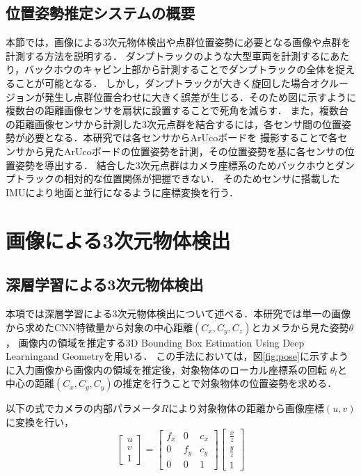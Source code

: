\subsection{位置姿勢推定システムの概要}
本節では，画像による3次元物体検出や点群位置姿勢に必要となる画像や点群を計測する方法を説明する．
ダンプトラックのような大型車両を計測するにあたり，バックホウのキャビン上部から計測することでダンプトラックの全体を捉えることが可能となる．
しかし，ダンプトラックが大きく旋回した場合オクルージョンが発生し点群位置合わせに大きく誤差が生じる．そのため図に示すように複数台の距離画像センサを扇状に設置することで死角を減らす．
また，複数台の距離画像センサから計測した3次元点群を結合するには，各センサ間の位置姿勢が必要となる．本研究では各センサからArUcoボード\cite{Garrido2015}を
撮影することで各センサから見たArUcoボードの位置姿勢を計測，その位置姿勢を基に各センサの位置姿勢を導出する．
結合した3次元点群はカメラ座標系のためバックホウとダンプトラックの相対的な位置関係が把握できない．
そのためセンサに搭載したIMUにより地面と並行になるように座標変換を行う．
\newpage
\section{画像による3次元物体検出}
\subsection{深層学習による3次元物体検出}
本項では深層学習による3次元物体検出について述べる．本研究では単一の画像から求めたCNN特徴量から対象の中心距離$(C_x, C_y, C_z)$とカメラから見た姿勢$\theta$，
画像内の領域を推定する3D Bounding Box Estimation Using Deep Learningand Geometry\cite{2017}を用いる．
この手法においては，図\ref{fig:pose}に示すように入力画像から画像内の領域を推定後，対象物体のローカル座標系の回転 $\theta_l$と中心の距離$(C_x, C_y, C_y)$の推定を行うことで対象物体の位置姿勢を求める．

以下の式でカメラの内部パラメータ$R$により対象物体の距離から画像座標$(u, v)$に変換を行い，
\begin{equation}
\begin{bmatrix}u  \\v \\1 \end{bmatrix}
=\begin{bmatrix}f_x & 0 & c_x\\0 & f_y & c_y\\0 &0 &1 \end{bmatrix}
\begin{bmatrix}\frac{x}{z}  \\\frac{y}{z} \\1 \end{bmatrix}
\end{equation}


